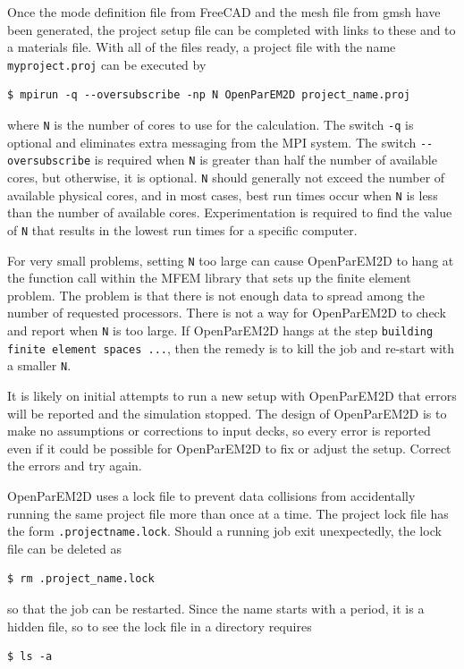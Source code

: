 \documentclass[titlepage]{article}
\renewcommand\_{\textunderscore\linebreak[1]}
\begin{document}
Once the mode definition file from FreeCAD and the mesh file from gmsh have been generated, the project setup file can be completed with links to these and to a materials file.  With all of the files ready, a project file with the name \texttt{my\_project.proj} can be executed by 
\begin{Verbatim}[fontsize=\small]
   $ mpirun -q --oversubscribe -np N OpenParEM2D project_name.proj
\end{Verbatim}
where \verb+N+ is the number of cores to use for the calculation.  The switch \verb+-q+ is optional and eliminates extra messaging from the MPI system.  The switch \verb+--oversubscribe+ is required when \verb+N+ is greater than half the number of available cores, but otherwise, it is optional.  \verb+N+ should generally not exceed the number of available physical cores, and in most cases, best run times occur when \verb+N+ is less than the number of available cores.  Experimentation is required to find the value of \verb+N+ that results in the lowest run times for a specific computer.

For very small problems, setting \verb+N+ too large can cause OpenParEM2D to hang at the function call within the MFEM library that sets up the finite element problem.  The problem is that there is not enough data to spread among the number of requested processors.  There is not a way for OpenParEM2D to check and report when \verb+N+ is too large.  If OpenParEM2D hangs at the step \texttt{building finite element spaces ...}, then the remedy is to kill the job and re-start with a smaller \verb+N+.

It is likely on initial attempts to run a new setup with OpenParEM2D that errors will be reported and the simulation stopped.  The design of OpenParEM2D is to make no assumptions or corrections to input decks, so every error is reported even if it could be possible for OpenParEM2D to fix or adjust the setup.  Correct the errors and try again.

OpenParEM2D uses a lock file to prevent data collisions from accidentally running the same project file more than once at a time.  The project lock file has the form \texttt{.project\_name.lock}.  Should a running job exit unexpectedly, the lock file can be deleted as 
\begin{Verbatim}[fontsize=\small]
   $ rm .project_name.lock
\end{Verbatim}
\noindent so that the job can be restarted.  Since the name starts with a period, it is a hidden file, so to see the lock file in a directory requires
\begin{Verbatim}[fontsize=\small]
   $ ls -a
\end{Verbatim}
\end{document}
